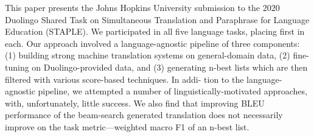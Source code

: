 This paper presents the Johns Hopkins University submission to the 2020 Duolingo Shared Task on Simultaneous Translation and Paraphrase for Language Education (STAPLE). We participated in all five language tasks, placing first in each. Our approach involved a language-agnostic pipeline of three components: (1) building strong machine translation systems on general-domain data, (2) fine-tuning on Duolingo-provided data, and (3) generating n-best lists which are then filtered with various score-based techniques. In addi- tion to the language-agnostic pipeline, we attempted a number of linguistically-motivated approaches, with, unfortunately, little success. We also find that improving BLEU performance of the beam-search generated translation does not necessarily improve on the task metric—weighted macro F1 of an n-best list.
